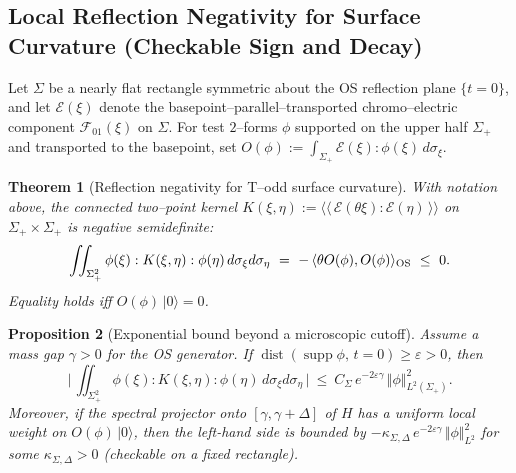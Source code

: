 \documentclass[11pt]{amsart}
\theoremstyle{plain}
\newtheorem{theorem}{Theorem}[section]
\newtheorem{proposition}[theorem]{Proposition}
\theoremstyle{definition}
\theoremstyle{remark}
\begin{document}
\subsection*{Local Reflection Negativity for Surface Curvature (Checkable Sign and Decay)}
\label{SurfNeg:section}
Let $\Sigma$ be a nearly flat rectangle symmetric about the OS reflection plane $\{t=0\}$, and let $\mathcal E(\xi)$ denote the basepoint--parallel--transported chromo--electric component $\mathcal F_{01}(\xi)$ on $\Sigma$. For test $2$--forms $\phi$ supported on the upper half $\Sigma_+$ and transported to the basepoint, set $O(\phi):=\int_{\Sigma_+} \mathcal E(\xi):\phi(\xi)\,d\sigma_\xi$.

\begin{theorem}[Reflection negativity for T--odd surface curvature]\label{SurfNeg:neg-def}
With notation above, the connected two--point kernel $K(\xi,\eta):=\big\langle\!\big\langle\,\mathcal E(\theta\xi):\mathcal E(\eta)\,\big\rangle\!\big\rangle$ on $\Sigma_+\times\Sigma_+$ is negative semidefinite:
\[
  \iint_{\Sigma_+^2} \phi(\xi):K(\xi,\eta):\phi(\eta)\,d\sigma_\xi d\sigma_\eta\ =\ -\,\langle\theta O(\phi),O(\phi)\rangle_{\rm OS}\ \le\ 0.
\]
Equality holds iff $O(\phi)\,\vert 0\rangle=0$.
\end{theorem}

\begin{proposition}[Exponential bound beyond a microscopic cutoff]\label{SurfNeg:exp-bound}
Assume a mass gap $\gamma>0$ for the OS generator. If $\operatorname{dist}(\operatorname{supp}\phi,\,t=0)\ge \varepsilon>0$, then
\[
  \Big\lvert\,\iint_{\Sigma_+^2} \phi(\xi):K(\xi,\eta):\phi(\eta)\,d\sigma_\xi d\sigma_\eta\,\Big\rvert\ \le\ C_{\Sigma}\,e^{-2\varepsilon\gamma}\,\Vert\phi\Vert_{L^2(\Sigma_+)}^2.
\]
Moreover, if the spectral projector onto $[\gamma,\gamma+\Delta]$ of $H$ has a uniform local weight on $O(\phi)\,\vert 0\rangle$, then the left-hand side is bounded by $-\kappa_{\Sigma,\Delta}\,e^{-2\varepsilon\gamma}\,\Vert\phi\Vert_{L^2}^2$ for some $\kappa_{\Sigma,\Delta}>0$ (checkable on a fixed rectangle).
\end{proposition}
\end{document}
